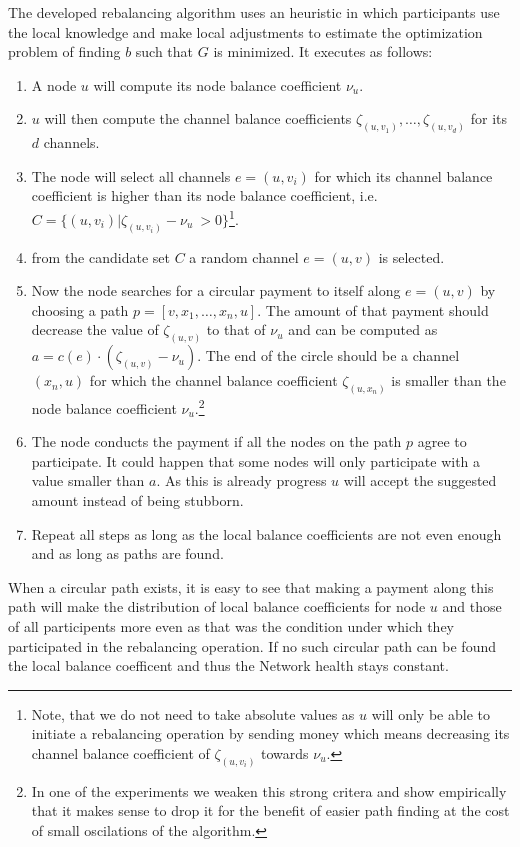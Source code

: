 \documentclass[a4paper]{paper}
\begin{document}
The developed rebalancing algorithm uses an heuristic in which participants use the local knowledge and make local adjustments to estimate the optimization problem of finding $b$ such that $G$ is minimized.
It executes as follows:
\begin{enumerate}
\item A node $u$ will compute its node balance coefficient $\nu_u$.
\item $u$ will then compute the channel balance coefficients $\zeta_{(u,v_1)},\dots,\zeta_{(u,v_d)}$ for its $d$ channels.
\item The node will select all channels $e=(u,v_i)$ for which its channel balance coefficient is higher 
than its node balance coefficient, i.e.~$C = \{(u,v_i) | \zeta_{(u,v_i)} - \nu_u\ > 0\}$\footnote{
  Note, that we do not need to take absolute values as $u$ will only be able to initiate a rebalancing operation by sending money which means decreasing its channel balance coefficient of $\zeta_{(u,v_i)}$ towards $\nu_u$.}.
\item from the candidate set $C$ a random channel $e=(u,v)$ is selected.
\item Now the node searches for a circular payment to itself along $e=(u,v)$ by choosing a path $p = [v,x_1,\dots,x_n,u]$. The amount of that payment should decrease the value of $\zeta_{(u,v)}$ to that of $\nu_u$ and can be computed as $a = c(e)\cdot (\zeta_{(u,v)}-\nu_u)$. The end of the circle should be a channel $(x_n,u)$ for which the channel balance coefficient $\zeta_{(u,x_n)}$ is smaller than the node balance coefficient $\nu_u$.\footnote{In one of the experiments we weaken this strong critera and show empirically that it makes sense to drop it for the benefit of easier path finding at the cost of small oscilations of the algorithm.}
\item The node conducts the payment if all the nodes on the path $p$ agree to participate. It could happen that some nodes will only participate with a value smaller than $a$. As this is already progress $u$ will accept the suggested amount instead of being stubborn. 
\item Repeat all steps as long as the local balance coefficients are not even enough and as long as paths are found.
\end{enumerate}

When a circular path exists, it is easy to see that making a payment along this path will make the distribution of local balance coefficients for node $u$ and those of all participents more even as that was the condition under which they participated in the rebalancing operation.
If no such circular path can be found the local balance coefficent and thus the Network health stays constant.
\end{document}
